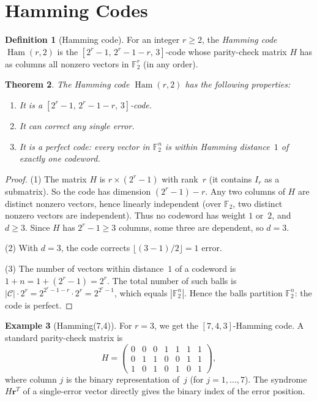 \documentclass[12pt,a4paper,openany]{book}
\theoremstyle{definition}
\newtheorem{definition}{Definition}[chapter]
\newtheorem{example}[definition]{Example}
\theoremstyle{plain}
\newtheorem{theorem}[definition]{Theorem}
\theoremstyle{remark}
\newcommand{\abs}[1]{\left|#1\right|}
\begin{document}

\section{Hamming Codes}
\label{sec:hamming}

\begin{definition}[Hamming code]
\label{def:hamming-code}
For an integer $r\ge 2$, the \emph{Hamming code} $\operatorname{Ham}(r,2)$
is the $[2^r-1,\,2^r-1-r,\,3]$-code whose parity-check matrix $H$ has
as columns all nonzero vectors in $\mathbb{F}_2^r$ (in any order).
\end{definition}

\begin{theorem}
\label{thm:hamming-properties}
The Hamming code $\operatorname{Ham}(r,2)$ has the following properties:
\begin{enumerate}
  \item It is a $[2^r-1,\,2^r-1-r,\,3]$-code.
  \item It can correct any single error.
  \item It is a \emph{perfect code}: every vector in $\mathbb{F}_2^n$
        is within Hamming distance~$1$ of exactly one codeword.
\end{enumerate}
\end{theorem}

\begin{proof}
(1) The matrix $H$ is $r\times(2^r-1)$ with rank~$r$ (it contains
$I_r$ as a submatrix).  So the code has dimension $(2^r-1)-r$.  Any two
columns of $H$ are distinct nonzero vectors, hence linearly independent
(over $\mathbb{F}_2$, two distinct nonzero vectors are independent).
Thus no codeword has weight $1$ or~$2$, and $d\ge 3$.  Since $H$ has
$2^r-1\ge 3$ columns, some three are dependent, so $d=3$.

(2) With $d=3$, the code corrects $\lfloor(3-1)/2\rfloor=1$ error.

(3) The number of vectors within distance~$1$ of a codeword is
$1+n=1+(2^r-1)=2^r$.  The total number of such balls is
$\abs{\mathcal{C}}\cdot 2^r=2^{2^r-1-r}\cdot 2^r=2^{2^r-1}$, which
equals $\abs{\mathbb{F}_2^n}$.  Hence the balls partition
$\mathbb{F}_2^n$: the code is perfect.
\end{proof}

\begin{example}[Hamming(7,4)]
\label{ex:hamming74}
For $r=3$, we get the $[7,4,3]$-Hamming code.  A standard parity-check
matrix is
\[
  H=\begin{pmatrix}
    0&0&0&1&1&1&1\\
    0&1&1&0&0&1&1\\
    1&0&1&0&1&0&1
  \end{pmatrix},
\]
where column $j$ is the binary representation of~$j$ (for $j=1,\dots,7$).
The syndrome $H\mathbf{r}^T$ of a single-error vector directly gives
the binary index of the error position.
\end{example}
\end{document}
